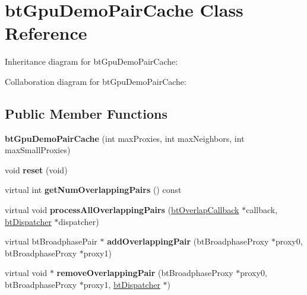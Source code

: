 \hypertarget{classbt_gpu_demo_pair_cache}{\section{bt\+Gpu\+Demo\+Pair\+Cache Class Reference}
\label{classbt_gpu_demo_pair_cache}
}


Inheritance diagram for bt\+Gpu\+Demo\+Pair\+Cache\+:


Collaboration diagram for bt\+Gpu\+Demo\+Pair\+Cache\+:
\subsection*{Public Member Functions}
\begin{DoxyCompactItemize}
\item 
\hypertarget{classbt_gpu_demo_pair_cache_aa5e3251dbfad0e072b28a2d93e2d8a6c}{{\bfseries bt\+Gpu\+Demo\+Pair\+Cache} (int max\+Proxies, int max\+Neighbors, int max\+Small\+Proxies)}\label{classbt_gpu_demo_pair_cache_aa5e3251dbfad0e072b28a2d93e2d8a6c}

\item 
\hypertarget{classbt_gpu_demo_pair_cache_a8fa57521ac0058709e604fede2b110f2}{void {\bfseries reset} (void)}\label{classbt_gpu_demo_pair_cache_a8fa57521ac0058709e604fede2b110f2}

\item 
\hypertarget{classbt_gpu_demo_pair_cache_a748a643674b1ee5502f62a8abaee5003}{virtual int {\bfseries get\+Num\+Overlapping\+Pairs} () const }\label{classbt_gpu_demo_pair_cache_a748a643674b1ee5502f62a8abaee5003}

\item 
\hypertarget{classbt_gpu_demo_pair_cache_a839f4afe44d8054b2fd3769ca06b5562}{virtual void {\bfseries process\+All\+Overlapping\+Pairs} (\hyperlink{structbt_overlap_callback}{bt\+Overlap\+Callback} $\ast$callback, \hyperlink{classbt_dispatcher}{bt\+Dispatcher} $\ast$dispatcher)}\label{classbt_gpu_demo_pair_cache_a839f4afe44d8054b2fd3769ca06b5562}

\item 
\hypertarget{classbt_gpu_demo_pair_cache_ac4a72df7ea7523a1a566925f21a7dfde}{virtual bt\+Broadphase\+Pair $\ast$ {\bfseries add\+Overlapping\+Pair} (bt\+Broadphase\+Proxy $\ast$proxy0, bt\+Broadphase\+Proxy $\ast$proxy1)}\label{classbt_gpu_demo_pair_cache_ac4a72df7ea7523a1a566925f21a7dfde}

\item 
\hypertarget{classbt_gpu_demo_pair_cache_ac6b6047d5ddfc7ecd0dec65e8f07eda6}{virtual void $\ast$ {\bfseries remove\+Overlapping\+Pair} (bt\+Broadphase\+Proxy $\ast$proxy0, bt\+Broadphase\+Proxy $\ast$proxy1, \hyperlink{classbt_dispatcher}{bt\+Dispatcher} $\ast$)}\label{classbt_gpu_demo_pair_cache_ac6b6047d5ddfc7ecd0dec65e8f07eda6}

\end{DoxyCompactItemize}
